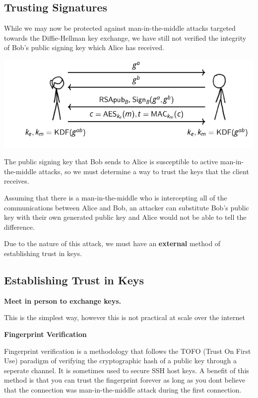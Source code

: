 \documentclass[11pt]{article} %
\begin{document}
\subsection{Trusting Signatures}
{\parindent0pt While we may now be protected against man-in-the-middle attacks 
targeted towards the Diffie-Hellman key exchange, we have still not verified 
the integrity of Bob's public signing key which Alice has received.}

\includegraphics[scale=.7]{./tls4.png}

{\parindent0pt The public signing key that Bob sends to Alice is susceptible to
active man-in-the-middle attacks, so we must determine a way to trust the keys 
that the client receives.}

\bigskip
{\parindent0pt Assuming that there is a man-in-the-middle who is intercepting 
all of the communications between Alice and Bob, an attacker can substitute 
Bob's public key with their own generated public key and Alice would not be 
able to tell the difference.}

\bigskip
{\parindent0pt Due to the nature of this attack, we must have an 
\textbf{external} method of establishing trust in keys.}

\subsection{Establishing Trust in Keys}

\bigskip
{\parindent0pt \textbf{Meet in person to exchange keys.}}

\smallskip
{\parindent0pt This is the simplest way, however this is not practical at scale
over the internet}

\bigskip
{\parindent0pt \textbf{Fingerprint Verification}}

\smallskip
{\parindent0pt Fingerprint verification is a methodology that follows the TOFO 
(Trust On First Use) paradigm of verifying the cryptographic hash of a public 
key through a seperate channel.  It is sometimes used to secure SSH host keys. 
A benefit of this method is that you can trust the fingerprint forever as long 
as you dont believe that the connection was man-in-the-middle attack during the
first connection.}
\end{document}
